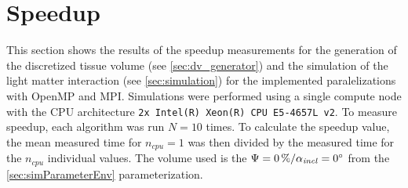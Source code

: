 \section{Speedup}
\label{sec:simSpeedup}
%
This section shows the results of the speedup measurements for the generation of the discretized tissue volume (see \cref{sec:dv_generator}) and the simulation of the light matter interaction (see \cref{sec:simulation}) for the implemented paralelizations with \ac{OpenMP} and \ac{MPI}.
Simulations were performed using a single compute node with the \ac{CPU} architecture \texttt{2x Intel(R) Xeon(R) CPU E5-4657L v2}.
To measure speedup, each algorithm was run $N=10$ times.
To calculate the speedup value, the mean measured time for $n_\mathit{cpu}=1$ was then divided by the measured time for the $n_\mathit{cpu}$ individual values.
The volume used is the $\textnormal{$\Psi$}=\SI{0}{\percent} / \textnormal{$\alpha_{\mathit{incl}}$}=\SI{0}{\degree}$ from the \cref{sec:simParameterEnv} parameterization.
% 
% 
% 
